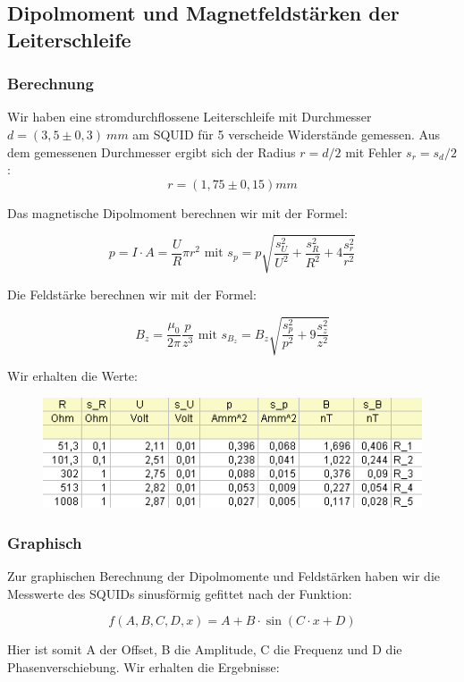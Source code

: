 \subsection{Dipolmoment und Magnetfeldstärken der Leiterschleife}

\subsubsection{Berechnung}

Wir haben eine stromdurchflossene Leiterschleife mit Durchmesser $d = (3,5 \pm 0,3)\ mm$ am SQUID für 5 verscheide Widerstände gemessen. Aus dem gemessenen Durchmesser ergibt sich der Radius $r=d/2$ mit Fehler $s_r = s_d/2$: $$r = (1,75 \pm 0,15) mm$$

Das magnetische Dipolmoment berechnen wir mit der Formel:

$$p = I\cdot A = \frac{U}{R}\pi r^2 \text{ \ \ \ mit \ \ \ } s_p = p\sqrt{\frac{s_U^2}{U^2} + \frac{s_R^2}{R^2} + 4\frac{s_r^2}{r^2}}$$

Die Feldstärke berechnen wir mit der Formel:

$$B_z = \frac{\mu_0}{2\pi}\frac{p}{z^3} \text{ \ \ \ mit \ \ \ } s_{B_z}=B_z\sqrt{\frac{s_p^2}{p^2} + 9 \frac{s_z^2}{z^2}}$$

Wir erhalten die Werte:

\begin{figure}[H]
	\centering \includegraphics{Bilder/Tab-Leiterschleife.png}
\end{figure}

\subsubsection{Graphisch}

Zur graphischen Berechnung der Dipolmomente und Feldstärken haben wir die Messwerte des SQUIDs sinusförmig gefittet nach der Funktion:

$$ f(A,B,C,D,x) = A + B\cdot\sin(C\cdot x + D) $$

Hier ist somit A der Offset, B die Amplitude, C die Frequenz und D die Phasenverschiebung. Wir erhalten die Ergebnisse:


